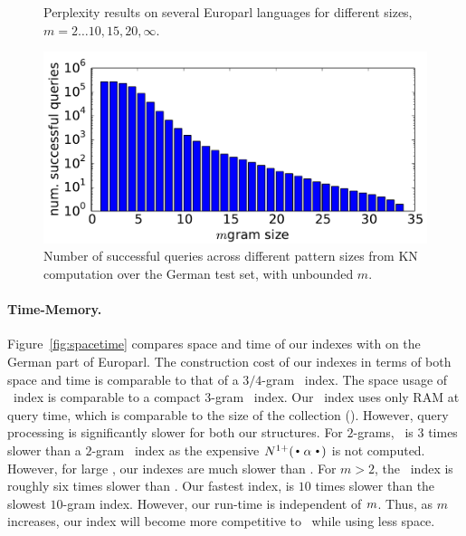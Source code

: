 \begin{figure}[tb]

\caption{Perplexity results on several Europarl languages for different \ngram sizes, $m=2\ldots10,15,20,\infty$.}
\label{fig:pplx}
\end{figure}

\begin{figure}[tb]
\includegraphics[width=\columnwidth]{figures/german_pattern_size.pdf}
\caption{Number of successful queries across different pattern sizes from KN computation over the German test set, with unbounded $m$.}
\label{fig:germanpattern}
\end{figure}


\paragraph{Time-Memory.}
Figure~\ref{fig:spacetime} compares space and time of our indexes with \SRILM on the German part of Europarl.
The construction cost of our indexes in terms of both space and time is comparable to that of 
a $3/4$-gram \SRILM\ index. The space usage of \dualCST\ index is comparable to
a compact $3$-gram \SRILM\ index. Our \singleCST\ index uses only  RAM
at query time, which is comparable to the size of the collection ().
However, query processing is significantly slower for both our structures.
For $2$-grams, \dualCST\ is $3$ times slower than a $2$-gram \SRILM\ index as
the expensive $\nlplus{\dotpatdot}$ is not computed. However, for large \ngrams,
our indexes are much slower than \SRILM. For $m>2$, 
the \dualCST\ index is roughly six times slower than \singleCST. Our fastest
index, is $10$ times slower than the slowest \SRILM $10$-gram index. However,
our run-time is independent of $m$. Thus, as $m$ increases, our index
will become more competitive to \SRILM\ while using less space.


